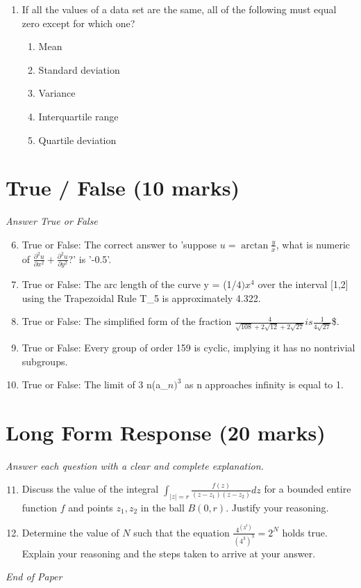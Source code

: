 \documentclass[12pt]{article}
\begin{document}
\begin{enumerate}[label=\arabic*.]
\begin{enumerate}[label=(\alph*)]
    \item 25.25
    \item 23.75
    \item 21.75
\end{enumerate}
\item If all the values of a data set are the same, all of the following must equal zero except for which one?
\begin{enumerate}[label=(\alph*)]
    \item Mean
    \item Standard deviation
    \item Variance
    \item Interquartile range
    \item Quartile deviation
\end{enumerate}
\end{enumerate}

\section*{True / False (10 marks)}
\textit{Answer True or False}
\begin{enumerate}[label=\arabic*.]
\setcounter{enumi}{5}
\item True or False: The correct answer to 'suppose $u=\arctan \frac{y}{x}$, what is numeric of $\frac{\partial^2 u}{\partial x^2}+\frac{\partial^2 u}{\partial y^2}$?' is '-0.5'.
\item True or False: The arc length of the curve y = (1/$4)x^4$ over the interval [1,2] using the Trapezoidal Rule T\_5 is approximately 4.322.
\item True or False: The simplified form of the fraction $\frac{4}{\sqrt{108}+2\sqrt{12}+2\sqrt{27}}$$ is $$\frac{1}{4\sqrt{27}}$\$.
\item True or False: Every group of order 159 is cyclic, implying it has no nontrivial subgroups.
\item True or False: The limit of 3 n(a\_$n)^3$ as n approaches infinity is equal to 1.
\end{enumerate}

\section*{Long Form Response (20 marks)}
\textit{Answer each question with a clear and complete explanation.}
\begin{enumerate}[label=\arabic*.]
\setcounter{enumi}{10}
\item Discuss the value of the integral $\int_{|z|=r} \frac{f(z)}{(z-z_1)(z-z_2)} dz$ for a bounded entire function $f$ and points $z_1, z_2$ in the ball $B(0,r)$. Justify your reasoning.
\item Determine the value of \( N \) such that the equation \( \frac{4^{(3^3)}}{(4^3)^3} = 2^N \) holds true. Explain your reasoning and the steps taken to arrive at your answer.
\end{enumerate}

\vfill
\noindent\textit{End of Paper}
\end{document}
